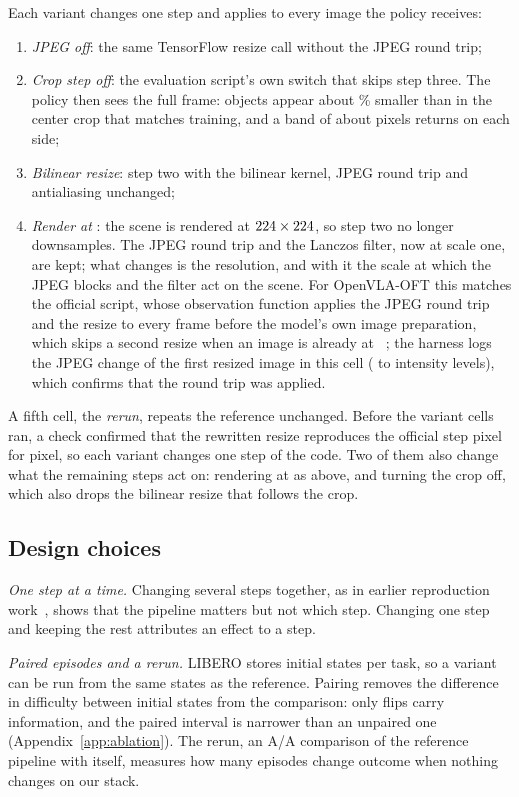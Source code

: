Each variant changes one step and applies to every image the policy receives:
\begin{enumerate}
\item \emph{JPEG off}: the same TensorFlow resize call without the JPEG round trip;
\item \emph{Crop step off}: the evaluation script's own switch that skips step three. The policy then sees the full frame: objects appear about \Zoom\% smaller than in the center crop that matches training, and a band of about \Border{} pixels returns on each side;
\item \emph{Bilinear resize}: step two with the bilinear kernel, JPEG round trip and antialiasing unchanged;
\item \emph{Render at \InputRes}: the scene is rendered at $224 \times 224$, so step two no longer downsamples. The JPEG round trip and the Lanczos filter, now at scale one, are kept; what changes is the resolution, and with it the scale at which the JPEG blocks and the filter act on the scene. For OpenVLA-OFT this matches the official script, whose observation function applies the JPEG round trip and the resize to every frame before the model's own image preparation, which skips a second resize when an image is already at \InputRes~\citep{oftcode}; the harness logs the JPEG change of the first resized image in this cell (\OftRendMadMin{} to \OftRendMadMax{} intensity levels), which confirms that the round trip was applied.
\end{enumerate}
A fifth cell, the \emph{rerun}, repeats the reference unchanged. Before the variant cells ran, a check confirmed that the rewritten resize reproduces the official step pixel for pixel, so each variant changes one step of the code. Two of them also change what the remaining steps act on: rendering at \InputRes{} as above, and turning the crop off, which also drops the bilinear resize that follows the crop.

\subsection{Design choices}
\label{sec:design}

\emph{One step at a time.} Changing several steps together, as in earlier reproduction work~\citep{vlaevalrepo}, shows that the pipeline matters but not which step. Changing one step and keeping the rest attributes an effect to a step.

\emph{Paired episodes and a rerun.} LIBERO stores \NStates{} initial states per task, so a variant can be run from the same \NPairs{} states as the reference. Pairing removes the difference in difficulty between initial states from the comparison: only flips carry information, and the paired interval is narrower than an unpaired one (Appendix~\ref{app:ablation}). The rerun, an A/A comparison of the reference pipeline with itself, measures how many episodes change outcome when nothing changes on our stack.

